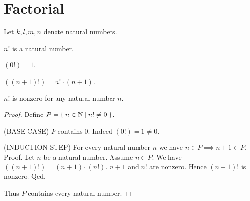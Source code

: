 \documentclass[../../natural-numbers.ftl.tex]{subfiles}
\begin{document}
  \section{Factorial}

  \begin{forthel}
  \end{forthel}

  \begin{forthel}
    Let $k, l, m, n$ denote natural numbers.
  \end{forthel}

  \begin{forthel}
    \begin{signature}
      $n!$ is a natural number.
    \end{signature}

    \begin{axiom}
      $(0!) = 1$.
    \end{axiom}

    \begin{axiom}
      $((n + 1)!) = n! \cdot (n + 1)$.
    \end{axiom}


    \begin{proposition}
      $n!$ is nonzero for any natural number $n$.
    \end{proposition}
    \begin{proof}
      Define $P = \Set{n \in \mathbb{N} | n! \neq 0}$.

      (BASE CASE) $P$ contains $0$.
      Indeed $(0!) = 1 \neq 0$.

      (INDUCTION STEP) For every natural number $n$ we have $n \in P \implies n + 1 \in P$. \\
      Proof.
        Let $n$ be a natural number.
        Assume $n \in P$.
        We have $((n + 1)!) = (n + 1) \cdot (n!)$.
        $n + 1$ and $n!$ are nonzero.
        Hence $(n + 1)!$ is nonzero.
      Qed.

      Thus $P$ contains every natural number.
    \end{proof}
  \end{forthel}
\end{document}
